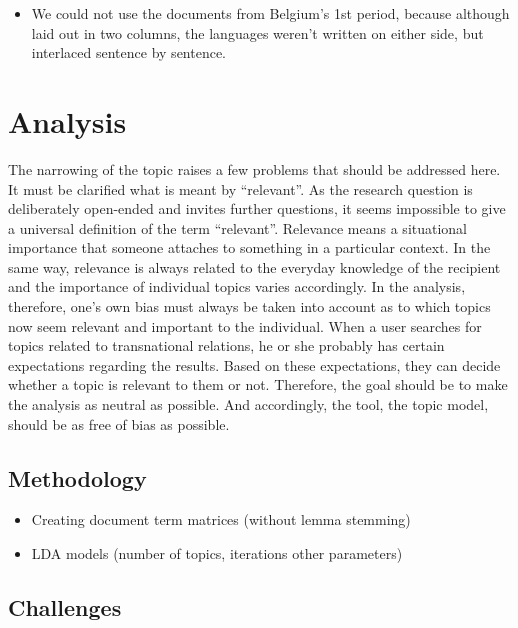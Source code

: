\documentclass[
  12pt,
]{scrreprt}
\providecommand{\tightlist}{%
  \setlength{\itemsep}{0pt}\setlength{\parskip}{0pt}}
\begin{document}
\begin{itemize}
\tightlist
\item
  We could not use the documents from Belgium's 1st period, because
  although laid out in two columns, the languages weren't written on
  either side, but interlaced sentence by sentence.
\end{itemize}

\hypertarget{analysis}{%
\chapter{Analysis}\label{analysis}}

The narrowing of the topic raises a few problems that should be
addressed here. It must be clarified what is meant by ``relevant''. As
the research question is deliberately open-ended and invites further
questions, it seems impossible to give a universal definition of the
term ``relevant''. Relevance means a situational importance that someone
attaches to something in a particular context. In the same way,
relevance is always related to the everyday knowledge of the recipient
and the importance of individual topics varies accordingly. In the
analysis, therefore, one's own bias must always be taken into account as
to which topics now seem relevant and important to the individual. When
a user searches for topics related to transnational relations, he or she
probably has certain expectations regarding the results. Based on these
expectations, they can decide whether a topic is relevant to them or
not. Therefore, the goal should be to make the analysis as neutral as
possible. And accordingly, the tool, the topic model, should be as free
of bias as possible.

\hypertarget{methodology}{%
\section{Methodology}\label{methodology}}

\begin{itemize}
\tightlist
\item
  Creating document term matrices (without lemma stemming)
\item
  LDA models (number of topics, iterations other parameters)
\end{itemize}

\hypertarget{challenges-1}{%
\section{Challenges}\label{challenges-1}}
\end{document}
